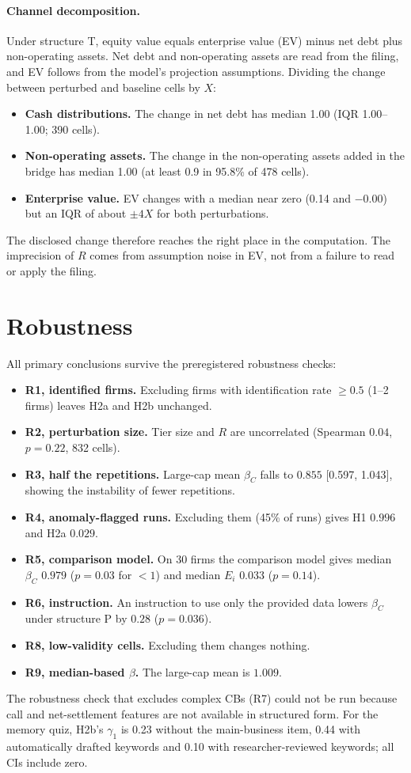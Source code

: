 \documentclass[11pt]{article}
\newcommand{\bC}{\beta_C}
\begin{document}
\paragraph{Channel decomposition.} Under structure T, equity value equals enterprise value (EV) minus net debt plus non-operating assets. Net debt and non-operating assets are read from the filing, and EV follows from the model's projection assumptions. Dividing the change between perturbed and baseline cells by $X$:
\begin{itemize}
\item \textbf{Cash distributions.} The change in net debt has median 1.00 (IQR 1.00--1.00; 390 cells).
\item \textbf{Non-operating assets.} The change in the non-operating assets added in the bridge has median 1.00 (at least 0.9 in 95.8\% of 478 cells).
\item \textbf{Enterprise value.} EV changes with a median near zero (0.14 and $-0.00$) but an IQR of about $\pm4X$ for both perturbations.
\end{itemize}
The disclosed change therefore reaches the right place in the computation. The imprecision of $R$ comes from assumption noise in EV, not from a failure to read or apply the filing.

\section{Robustness}

All primary conclusions survive the preregistered robustness checks:
\begin{itemize}
\item \textbf{R1, identified firms.} Excluding firms with identification rate $\geq 0.5$ (1--2 firms) leaves H2a and H2b unchanged.
\item \textbf{R2, perturbation size.} Tier size and $R$ are uncorrelated (Spearman $0.04$, $p=0.22$, 832 cells).
\item \textbf{R3, half the repetitions.} Large-cap mean $\bC$ falls to $0.855$ [0.597, 1.043], showing the instability of fewer repetitions.
\item \textbf{R4, anomaly-flagged runs.} Excluding them (45\% of runs) gives H1 $0.996$ and H2a $0.029$.
\item \textbf{R5, comparison model.} On 30 firms the comparison model gives median $\bC$ $0.979$ ($p=0.03$ for $<1$) and median $E_i$ $0.033$ ($p=0.14$).
\item \textbf{R6, instruction.} An instruction to use only the provided data lowers $\bC$ under structure P by $0.28$ ($p=0.036$).
\item \textbf{R8, low-validity cells.} Excluding them changes nothing.
\item \textbf{R9, median-based $\beta$.} The large-cap mean is $1.009$.
\end{itemize}
The robustness check that excludes complex CBs (R7) could not be run because call and net-settlement features are not available in structured form. For the memory quiz, H2b's $\gamma_1$ is 0.23 without the main-business item, 0.44 with automatically drafted keywords and 0.10 with researcher-reviewed keywords; all CIs include zero.
\end{document}
